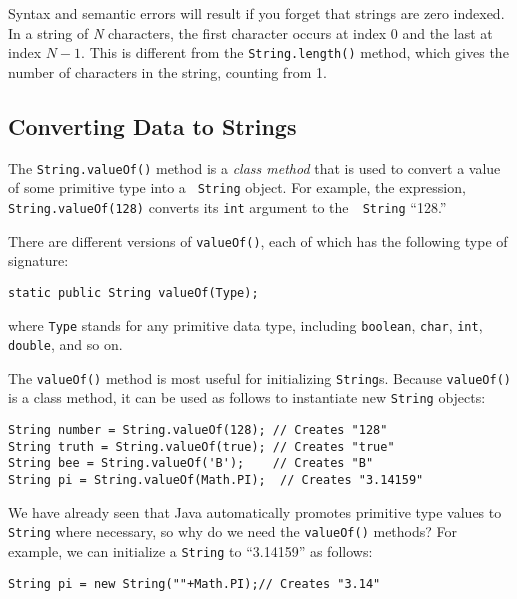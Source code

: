 {Syntax and semantic errors will result if you forget that strings are
zero indexed.  In a string of {\it N} characters, the first character
occurs at index 0 and the last at index $N-1$. This is
different from the {\tt String.length()} method, which gives the
number of characters in the string, counting from 1.}

\subsection{Converting Data to Strings}
\noindent The {\tt String.valueOf()} method is a {\it class method}
that is used to convert a value of some primitive type into a {\tt
String} object.  For example, the expression, {\tt
String.valueOf(128)} converts its {\tt int} argument to the~{\tt
String} ``128.''

There are different versions of  {\tt valueOf()}, each of which
has the following type of signature:

\begin{jjjlisting}
\begin{lstlisting}
static public String valueOf(Type);
\end{lstlisting}
\end{jjjlisting}

\noindent where {\tt Type} stands for any primitive data type,
including {\tt boolean}, {\tt char}, {\tt int}, {\tt double}, and so
on.

The {\tt valueOf()} method is most useful for initializing
{\tt String}s.  Because {\tt valueOf()} is a class method, it can be used as
follows to instantiate new {\tt String} objects:

\begin{jjjlisting}
\begin{lstlisting}
String number = String.valueOf(128); // Creates "128"
String truth = String.valueOf(true); // Creates "true"
String bee = String.valueOf('B');    // Creates "B"
String pi = String.valueOf(Math.PI);  // Creates "3.14159"
\end{lstlisting}
\end{jjjlisting}

\noindent We have already seen that Java automatically promotes
primitive type values to {\tt String} where necessary, so why do we
need the {\tt valueOf()} methods?  For example, we can initialize a
{\tt String} to ``3.14159'' as follows:

\begin{jjjlisting}
\begin{lstlisting}
String pi = new String(""+Math.PI);// Creates "3.14"
\end{lstlisting}
\end{jjjlisting}

